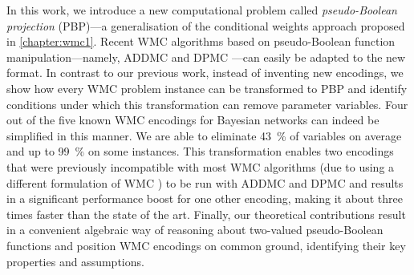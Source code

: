 In this work, we introduce a new computational problem called
\emph{pseudo-Boolean projection} (PBP)---a generalisation of the conditional
weights approach proposed in \cref{chapter:wmc1}. Recent WMC algorithms based on
pseudo-Boolean function manipulation---namely, \textsc{ADDMC}
\citep{DBLP:conf/aaai/DudekPV20} and \textsc{DPMC}
\citep{DBLP:conf/cp/DudekPV20}---can easily be adapted to the new format. In
contrast to our previous work, instead of inventing new encodings, we show how
every WMC problem instance can be transformed to PBP and identify conditions
under which this transformation can remove parameter variables. Four out of the
five known WMC encodings for Bayesian networks
\citep{DBLP:conf/ecai/BartKLM16,DBLP:conf/ijcai/ChaviraD05,DBLP:conf/sat/ChaviraD06,DBLP:conf/kr/Darwiche02,DBLP:conf/aaai/SangBK05}
can indeed be simplified in this manner. We are able to eliminate
\SI{43}{\percent} of variables on average and up to \SI{99}{\percent} on some
instances. This transformation enables two encodings that were previously
incompatible with most WMC algorithms (due to using a different formulation of
WMC \citep{DBLP:conf/ijcai/ChaviraD05,DBLP:conf/sat/ChaviraD06}) to be run with
\textsc{ADDMC} and \textsc{DPMC} and results in a significant performance boost
for one other encoding, making it about three times faster than the state of the
art. Finally, our theoretical contributions result in a convenient algebraic way
of reasoning about two-valued pseudo-Boolean functions and position WMC
encodings on common ground, identifying their key properties and assumptions.



